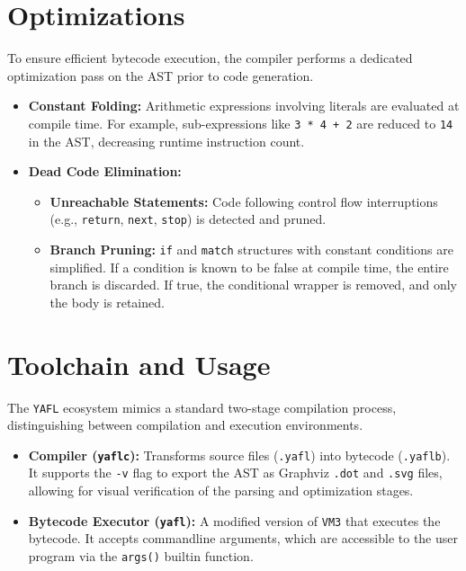 \documentclass[11pt,a4paper]{article}
\begin{document}
\section{Optimizations}
To ensure efficient bytecode execution, the compiler performs a dedicated optimization pass on the AST prior to code generation.

\begin{itemize}
    \item \textbf{Constant Folding:} Arithmetic expressions involving literals are evaluated at compile time.
    For example, sub-expressions like \texttt{3 * 4 + 2} are reduced to \texttt{14} in the AST, decreasing runtime instruction count.
    \item \textbf{Dead Code Elimination:}
    \begin{itemize}
        \item \textbf{Unreachable Statements:} Code following control flow interruptions (e.g., \texttt{return}, \texttt{next}, \texttt{stop}) is detected and pruned.
        \item \textbf{Branch Pruning:} \texttt{if} and \texttt{match} structures with constant conditions are simplified.
        If a condition is known to be false at compile time, the entire branch is discarded. If true, the conditional wrapper is removed, and only the body is retained.
    \end{itemize}
\end{itemize}

\section{Toolchain and Usage}
The \texttt{YAFL} ecosystem mimics a standard two-stage compilation process, distinguishing between compilation and execution environments.

\begin{itemize}
    \item \textbf{Compiler (\texttt{yaflc}):} Transforms source files (\texttt{.yafl}) into bytecode (\texttt{.yaflb}).
    It supports the \texttt{-v} flag to export the AST as Graphviz \texttt{.dot} and \texttt{.svg} files, allowing for visual verification of the parsing and optimization stages.
    \item \textbf{Bytecode Executor (\texttt{yafl}):} A modified version of \texttt{VM3} that executes the bytecode.
    It accepts commandline arguments, which are accessible to the user program via the \texttt{args()} builtin function.
\end{itemize}
\end{document}

